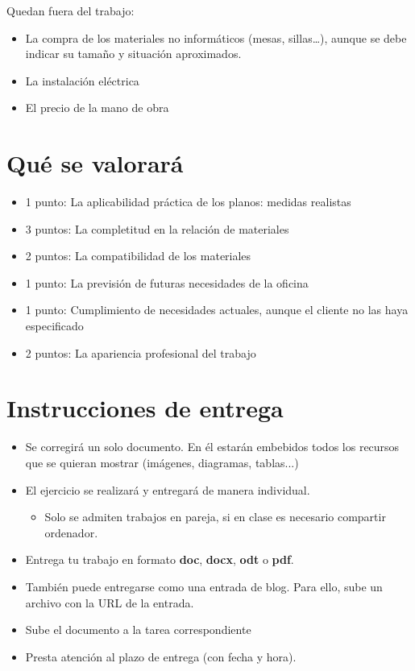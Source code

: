 Quedan fuera del trabajo:
\begin{itemize}
\item La compra de los materiales no informáticos (mesas, sillas…), aunque se debe indicar su tamaño y situación aproximados.
\item La instalación eléctrica
\item El precio de la mano de obra
\end{itemize}

\section{Qué se valorará}
\begin{itemize}
\item 1 punto: La aplicabilidad práctica de los planos: medidas realistas
\item 3 puntos: La completitud en la relación de materiales
\item 2 puntos: La compatibilidad de los materiales
\item 1 punto: La previsión de futuras necesidades de la oficina
\item 1 punto: Cumplimiento de necesidades actuales, aunque el cliente no las haya especificado
\item 2 puntos: La apariencia profesional del trabajo
\end{itemize}

\section{Instrucciones de entrega}
\begin{itemize}
\item Se corregirá un solo documento. En él estarán embebidos todos los recursos que se quieran mostrar (imágenes, diagramas, tablas...)
\item El ejercicio se realizará y entregará de manera individual.
  \begin{itemize}
  \item Solo se admiten trabajos en pareja, si en clase es necesario compartir ordenador.
  \end{itemize}
\item Entrega tu trabajo en formato \textbf{doc}, \textbf{docx}, \textbf{odt} o \textbf{pdf}.
\item También puede entregarse como una entrada de blog. Para ello, sube un archivo con la URL de la entrada.
\item Sube el documento a la tarea correspondiente 
\item Presta atención al plazo de entrega (con fecha y hora).
  
\end{itemize}

